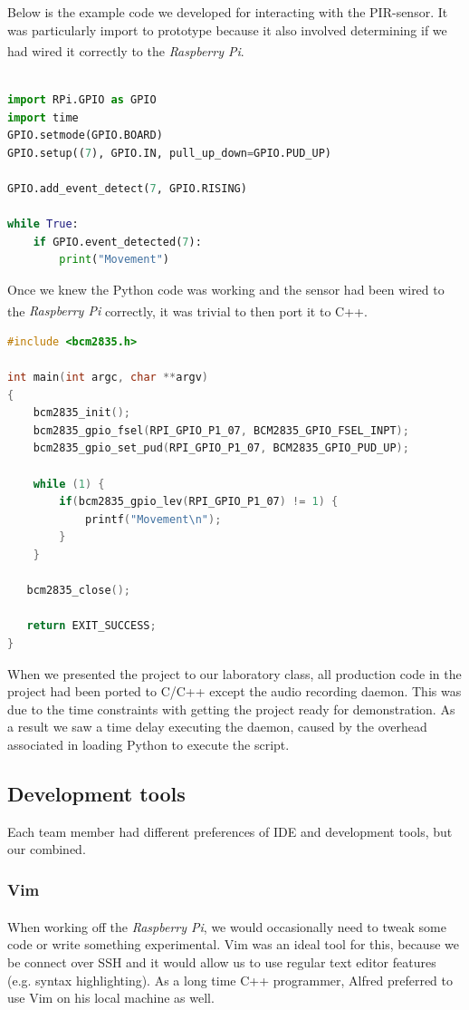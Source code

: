 \documentclass[11pt,a4paper,titlepage]{report}
\newcommand{\rpi}{\textit{Raspberry Pi\textsuperscript{\textregistered}}}
\begin{document}
Below is the example code we developed for interacting with the PIR-sensor. It was particularly import to prototype because it also involved determining if we had wired it correctly to the \rpi.

\begin{lstlisting}[caption={Python code for interacting with the PIR-sensor},label=pir-sensor-test.py,language=python]

import RPi.GPIO as GPIO
import time
GPIO.setmode(GPIO.BOARD)
GPIO.setup((7), GPIO.IN, pull_up_down=GPIO.PUD_UP)

GPIO.add_event_detect(7, GPIO.RISING)

while True:
    if GPIO.event_detected(7):
        print("Movement")
\end{lstlisting}

Once we knew the Python code was working and the sensor had been wired to the \rpi\xspace correctly, it was trivial to then port it to C++.

\begin{lstlisting}[caption={C++ port of PIR-sensor code},label=pir-sensor-test.cpp,language=C++]
#include <bcm2835.h>

int main(int argc, char **argv)
{
    bcm2835_init();
    bcm2835_gpio_fsel(RPI_GPIO_P1_07, BCM2835_GPIO_FSEL_INPT);
    bcm2835_gpio_set_pud(RPI_GPIO_P1_07, BCM2835_GPIO_PUD_UP);

    while (1) {
        if(bcm2835_gpio_lev(RPI_GPIO_P1_07) != 1) {
            printf("Movement\n");
        }
    }

   bcm2835_close();

   return EXIT_SUCCESS;
}
\end{lstlisting}

When we presented the project to our laboratory class, all production code in the project had been ported to C/C++ except the audio recording daemon. This was due to the time constraints with getting the project ready for demonstration. As a result we saw a time delay executing the daemon, caused by the overhead associated in loading Python to execute the script.


\subsection{Development tools}

Each team member had different preferences of IDE and development tools, but our combined.


\subsubsection{Vim}
    When working off the \rpi, we would occasionally need to tweak some code or write something experimental. Vim was an ideal tool for this, because we be connect over SSH and it would allow us to use regular text editor features (e.g. syntax highlighting). As a long time C++ programmer, Alfred preferred to use Vim on his local machine as well.
\end{document}

